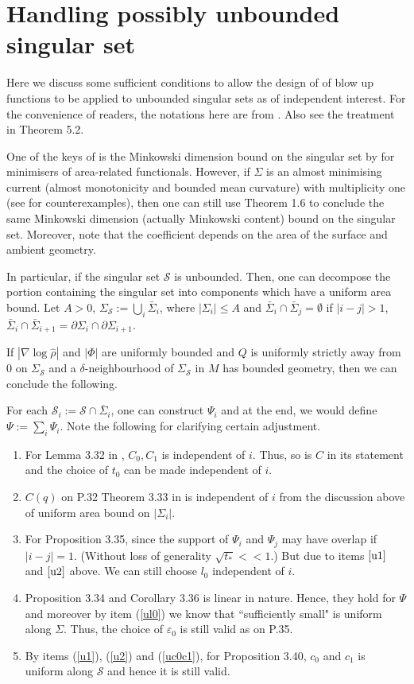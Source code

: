 \documentclass[11pt]{amsart}
\theoremstyle{remark}
\numberwithin{equation}{section}
\def\S{\Sigma}
\def\Na{\nabla}
\def\eps{\varepsilon}
\def\MS{\mathcal{S}}
\def\MS{\mathcal{S}}
\begin{document}
{{\section{Handling possibly unbounded singular set}\label{Singular}
Here we discuss some sufficient conditions to allow the design of \cite{BW1} of blow up functions to be applied to unbounded singular sets as of independent interest.  For the convenience of readers, the notations here are from \cite{BW1}.  Also see the treatment in \cite{HKLZ} Theorem 5.2. 

One of the keys of \cite{BW1} is the Minkowski dimension bound on the singular set by \cite{CN} for minimisers of area-related functionals.  However, if $\S$ is an almost minimising current (almost monotonicity and bounded mean curvature) with multiplicity one (see \cite{GS} for counterexamples), then one can still use \cite{NV} Theorem 1.6 to conclude the same Minkowski dimension (actually Minkowski content) bound on the singular set.  Moreover,  note that the coefficient depends on the area of the surface and ambient geometry.  

In particular,  if the singular set $\mathcal{S}$ is unbounded.  Then, one can decompose the portion containing the singular set into components which have a uniform area bound.  Let $A>0$,  $\S_\MS:=\bigcup_{i} \bar \S_i$, where $|\S_i|\leq A$ and $\bar \S_i \cap \bar \S_j=\emptyset$ if $|i-j|>1$, $\bar \S_i \cap \bar \S_{i+1}=\partial \S_{i}\cap\partial \S_{i+1}$.  

If $|\Na \log \hat \rho|$ and $|\Phi|$ are uniformly bounded and $Q$ is uniformly strictly away from 0 on $\S_{\MS}$ and a $\delta$-neighbourhood of $\S_{\MS}$ in $M$ has bounded geometry,  then we can conclude the following.  

For each $\MS_i:=\MS \cap \bar \S_i$, one can construct $\Psi_i$ and at the end, we would define $\Psi:= \sum_{i} \Psi_i$. Note the following for clarifying certain adjustment.  
\begin{enumerate} 
\item\label{u1} For Lemma 3.32 in \cite{BW1},  $C_0, C_1$ is independent of $i$.  Thus, so is $C$ in its statement and the choice of $t_0$ can be made independent of $i$. 
\item\label{u2} $C(q)$ on P.32 Theorem 3.33 in \cite{BW1} is independent of $i$ from the discussion above of uniform area bound on $|\S_i|$.  
\item\label{ul0} For \cite{BW1} Proposition 3.35,  since the support of $\Psi_i$ and $\Psi_j$ may have overlap if $|i-j|=1$.  (Without loss of generality $\sqrt{t_*}<<1$.)  But due to items $\ref{u1}$ and $\ref{u2}$ above.  We can still choose $l_0$ independent of $i$.  
\item\label{uc0c1} \cite{BW1} Proposition 3.34 and Corollary 3.36 is linear in nature.  Hence, they hold for $\Psi$ and moreover by item (\ref{ul0}) we know that ``sufficiently small" is uniform along $\S$.  Thus, the choice of $\eps_0$ is still valid as on \cite{BW1} P.35.  
\item By items (\ref{u1}), (\ref{u2}) and (\ref{uc0c1}), for \cite{BW1} Proposition 3.40, $c_0$ and $c_1$ is uniform along $\MS$ and hence it is still valid. 
\end{enumerate}

}}
\end{document}

